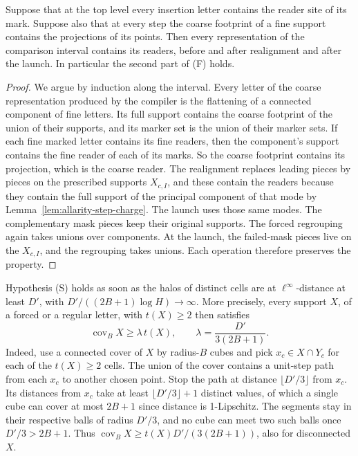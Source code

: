 \begin{lemma}
\label{lem:allarity-reader-containment}
Suppose that at the top level every insertion letter contains the reader
site of its mark. Suppose also that at every step the coarse footprint of a
fine support contains the projections of its points. Then every
representation of the comparison interval contains its readers, before and
after realignment and after the launch. In particular the second part of
(F) holds.
\end{lemma}
\begin{proof}
We argue by induction along the interval. Every letter of the coarse
representation produced by the compiler is the flattening of a connected
component of fine letters. Its full support contains the coarse footprint
of the union of their supports, and its marker set is the union of their
marker sets. If each fine marked letter contains its fine readers, then
the component's support contains the fine reader of each of its marks. So
the coarse footprint contains its projection, which is the coarse reader.
The realignment replaces leading pieces by pieces on the prescribed
supports $X_{c,I}$, and these contain the readers because they contain the full support of
the principal component of that mode by Lemma~\ref{lem:allarity-step-charge}.
The launch uses those same modes. The complementary mask pieces keep their original supports.
The forced regrouping again takes unions over components. At the launch,
the failed-mask pieces live on the $X_{c,I}$, and the regrouping takes
unions. Each operation therefore preserves the property.
\end{proof}

Hypothesis (S) holds as soon as the halos of distinct cells are at
$\ell^\infty$-distance at least $D'$, with $D'/((2B+1)\log H)\to\infty$.
More precisely, every support $X$, of a forced or a regular letter, with
$t(X)\ge2$ then satisfies
\begin{equation}\label{eq:allarity-dispersal}
 \operatorname{cov}_BX\ge\lambda\,t(X),\qquad \lambda=\frac{D'}{3(2B+1)} .
\end{equation}
Indeed, use a connected cover of $X$ by radius-$B$ cubes and pick
$x_c\in X\cap Y_c$ for each of the $t(X)\ge2$ cells. The union of the cover
contains a unit-step path from each $x_c$ to another chosen point. Stop the
path at distance $\lfloor D'/3\rfloor$ from $x_c$. Its distances from $x_c$
take at least $\lfloor D'/3\rfloor+1$ distinct values, of which a single
cube can cover at most $2B+1$ since distance is 1-Lipschitz. The segments
stay in their respective balls of radius $D'/3$, and no cube can meet
two such balls once $D'/3>2B+1$. Thus
$\operatorname{cov}_BX\ge t(X)D'/(3(2B+1))$, also for disconnected $X$.


